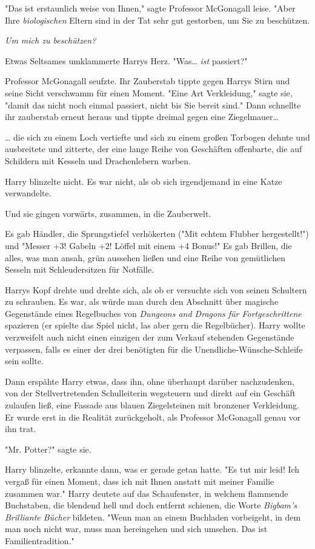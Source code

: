 {"Das ist erstaunlich weise von Ihnen," sagte Professor McGonagall leise. "Aber Ihre \emph{biologischen} Eltern sind in der Tat sehr gut gestorben, um Sie zu beschützen.

\emph{Um mich zu beschützen?}

Etwas Seltsames umklammerte Harrys Herz. "Was… \emph{ist} passiert?"

Professor McGonagall seufzte. Ihr Zauberstab tippte gegen Harrys Stirn und seine Sicht verschwamm für einen Moment. "Eine Art Verkleidung," sagte sie, "damit das nicht noch einmal passiert, nicht bis Sie bereit sind." Dann schnellte ihr zauberstab erneut heraus und tippte dreimal gegen eine Ziegelmauer…

… die sich zu einem Loch vertiefte und sich zu einem großen Torbogen dehnte und ausbreitete und zitterte, der eine lange Reihe von Geschäften offenbarte, die auf Schildern mit Kesseln und Drachenlebern warben.

Harry blinzelte nicht. Es war nicht, als ob sich irgendjemand in eine Katze verwandelte.

Und sie gingen vorwärts, zusammen, in die Zauberwelt.

Es gab Händler, die Sprungstiefel verhökerten ("Mit echtem Flubber hergestellt!") und "Messer +3! Gabeln +2! Löffel mit einem +4 Bonus!" Es gab Brillen, die alles, was man ansah, grün aussehen ließen und eine Reihe von gemütlichen Sesseln mit Schleudersitzen für Notfälle.

Harrys Kopf drehte und drehte sich, als ob er versuchte sich von seinen Schultern zu schrauben. Es war, als würde man durch den Abschnitt über magische Gegenstände eines Regelbuches von \emph{Dungeons and Dragons für Fortgeschrittene} spazieren (er spielte das Spiel nicht, las aber gern die Regelbücher). Harry wollte verzweifelt auch nicht einen einzigen der zum Verkauf stehenden Gegenstände verpassen, falls es einer der drei benötigten für die Unendliche-Wünsche-Schleife sein sollte.

Dann erspähte Harry etwas, dass ihn, ohne überhaupt darüber nachzudenken, von der Stellvertretenden Schulleiterin wegsteuern und direkt auf ein Geschäft zulaufen ließ, eine Fassade aus blauen Ziegelsteinen mit bronzener Verkleidung. Er wurde erst in die Realität zurückgeholt, als Professor McGonagall genau vor ihn trat.

"Mr. Potter?" sagte sie.

Harry blinzelte, erkannte dann, was er gerade getan hatte. "Es tut mir leid! Ich vergaß für einen Moment, dass ich mit Ihnen anstatt mit meiner Familie zusammen war." Harry deutete auf das Schaufenster, in welchem flammende Buchstaben, die blendend hell und doch entfernt schienen, die Worte \emph{Bigbam's Brilliante Bücher} bildeten. "Wenn man an einem Buchladen vorbeigeht, in dem man noch nicht war, muss man hereingehen und sich umsehen. Das ist Familientradition."

}
